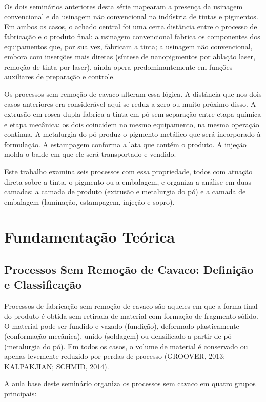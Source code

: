 \documentclass[
  12pt,
  a4paper,
  oneside,
  brazil,
  chapter=TITLE
]{article}
\newcommand{\secbreak}{\clearpage}
\let\oldsection\section
\renewcommand{\section}{\secbreak\oldsection}
\begin{document}
Os dois seminários anteriores desta série mapearam a presença da usinagem
convencional e da usinagem não convencional na indústria de tintas e pigmentos.
Em ambos os casos, o achado central foi uma certa distância entre o processo de
fabricação e o produto final: a usinagem convencional fabrica os componentes dos
equipamentos que, por sua vez, fabricam a tinta; a usinagem não convencional,
embora com inserções mais diretas (síntese de nanopigmentos por ablação laser,
remoção de tinta por laser), ainda opera predominantemente em funções auxiliares
de preparação e controle.

Os processos sem remoção de cavaco alteram essa lógica. A distância que nos dois
casos anteriores era considerável aqui se reduz a zero ou muito próximo disso. A
extrusão em rosca dupla fabrica a tinta em pó sem separação entre etapa química e
etapa mecânica: os dois coincidem no mesmo equipamento, na mesma operação
contínua. A metalurgia do pó produz o pigmento metálico que será incorporado à
formulação. A estampagem conforma a lata que contém o produto. A injeção molda o
balde em que ele será transportado e vendido.

Este trabalho examina seis processos com essa propriedade, todos com atuação
direta sobre a tinta, o pigmento ou a embalagem, e organiza a análise em duas
camadas: a camada de produto (extrusão e metalurgia do pó) e a camada de
embalagem (laminação, estampagem, injeção e sopro).

\section{Fundamentação Teórica}\label{fundamentacao-teorica}

\subsection{Processos Sem Remoção de Cavaco: Definição e Classificação}\label{def-classificacao}

Processos de fabricação sem remoção de cavaco são aqueles em que a forma final do
produto é obtida sem retirada de material com formação de fragmento sólido. O
material pode ser fundido e vazado (fundição), deformado plasticamente
(conformação mecânica), unido (soldagem) ou densificado a partir de pó
(metalurgia do pó). Em todos os casos, o volume de material é conservado ou
apenas levemente reduzido por perdas de processo (GROOVER, 2013; KALPAKJIAN;
SCHMID, 2014).

A aula base deste seminário organiza os processos sem cavaco em quatro grupos
principais:
\end{document}

